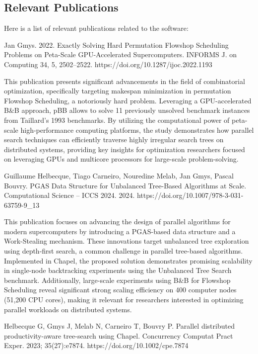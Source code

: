 \subsection{Relevant Publications}
\label{sec:pBB:publications}

Here is a list of relevant publications related to the software:

Jan Gmys. 2022. Exactly Solving Hard Permutation Flowshop Scheduling Problems on Peta-Scale GPU-Accelerated Supercomputers. INFORMS J. on Computing 34, 5, 2502–2522. https://doi.org/10.1287/ijoc.2022.1193

This publication presents significant advancements in the field of combinatorial optimization, specifically targeting makespan minimization in permutation Flowshop Scheduling, a notoriously hard problem. Leveraging a GPU-accelerated B\&B approach, pBB allows to solve 11 previously unsolved benchmark instances from Taillard's 1993 benchmarks. By utilizing the computational power of peta-scale high-performance computing platforms, the study demonstrates how parallel search techniques can efficiently traverse highly irregular search trees on distributed systems, providing key insights for optimization researchers focused on leveraging GPUs and multicore processors for large-scale problem-solving.

Guillaume Helbecque, Tiago Carneiro, Nouredine Melab, Jan Gmys, Pascal Bouvry. PGAS Data Structure for Unbalanced Tree-Based Algorithms at Scale. Computational Science – ICCS 2024. 2024. https://doi.org/10.1007/978-3-031-63759-9\_13

This publication focuses on advancing the design of parallel algorithms for modern supercomputers by introducing a PGAS-based data structure and a Work-Stealing mechanism. These innovations target unbalanced tree exploration using depth-first search, a common challenge in parallel tree-based algorithms. Implemented in Chapel, the proposed solution demonstrates promising scalability in single-node backtracking experiments using the Unbalanced Tree Search benchmark. Additionally, large-scale experiments using B\&B for Flowshop Scheduling reveal significant strong scaling efficiency on 400 computer nodes (51,200 CPU cores), making it relevant for researchers interested in optimizing parallel workloads on distributed systems.

Helbecque G, Gmys J, Melab N, Carneiro T, Bouvry P. Parallel distributed productivity-aware tree-search using Chapel. Concurrency Computat Pract Exper. 2023; 35(27):e7874. https://doi.org/10.1002/cpe.7874


